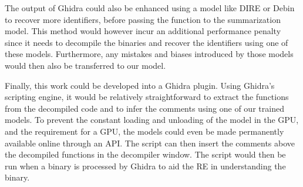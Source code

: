 The output of Ghidra could also be enhanced using a model like DIRE \cite{Dire} or Debin \cite{Debin} to recover more identifiers, before passing the function to the summarization model. This method would however incur an additional performance penalty since it needs to decompile the binaries and recover the identifiers using one of these models. Furthermore, any mistakes and biases introduced by those models would then also be transferred to our model.




Finally, this work could be developed into a Ghidra plugin. Using Ghidra's scripting engine, it would be relatively straightforward to extract the functions from the decompiled code and to infer the comments using one of our trained models. To prevent the constant loading and unloading of the model in the GPU, and the requirement for a GPU, the models could even be made permanently available online through an API. The script can then insert the comments above the decompiled functions in the decompiler window. The script would then be run when a binary is processed by Ghidra to aid the RE in understanding the binary.
